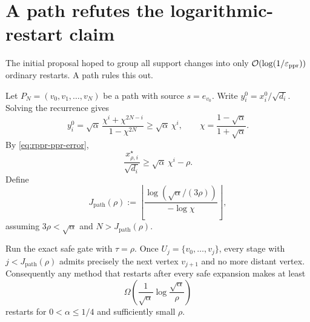 \section{A path refutes the logarithmic-restart claim}
\label{sec:path}

The initial proposal hoped to group all support changes into only
$\mathcal{O}(\log(1/\varepsilon_{\mathrm{ppr}}))$ ordinary restarts.  A path rules this out.

Let $P_N=(v_0,v_1,\ldots,v_N)$ be a path with source $s=e_{v_0}$.  Write
$y_i^0=x_i^0/\sqrt{d_i}$.  Solving the recurrence gives
\begin{equation}
 y_i^0
 =\sqrt\alpha\,
   \frac{\chi^i+\chi^{2N-i}}{1-\chi^{2N}}
 \geq\sqrt\alpha\,\chi^i,
 \qquad
 \chi=\frac{1-\sqrt\alpha}{1+\sqrt\alpha}.
 \label{eq:path-solution}
\end{equation}
By \cref{eq:rppr-ppr-error},
\begin{equation}
  \frac{x_{\rho,i}^\star}{\sqrt{d_i}}
  \geq\sqrt\alpha\,\chi^i-\rho.
  \label{eq:path-rppr-lower}
\end{equation}
Define
\begin{equation}
 J_{\mathrm{path}}(\rho):=\left\lfloor
   \frac{\log(\sqrt\alpha/(3\rho))}{-\log\chi}
 \right\rfloor,
 \label{eq:path-radius}
\end{equation}
assuming $3\rho<\sqrt\alpha$ and $N>J_{\mathrm{path}}(\rho)$.

\begin{theorem}
\label{thm:path-expansion}
Run the exact safe gate with $\tau=\rho$.  Once
$U_j=\{v_0,\ldots,v_j\}$, every stage with
$j<J_{\mathrm{path}}(\rho)$ admits precisely the
next vertex $v_{j+1}$ and no more distant vertex.  Consequently any method
that restarts after every safe expansion makes at least
\begin{equation}
 \Omega\!\left(
   \frac1{\sqrt\alpha}
   \log\frac{\sqrt\alpha}{\rho}
 \right)
 \label{eq:path-restarts}
\end{equation}
restarts for $0<\alpha\leq1/4$ and sufficiently small $\rho$.
\end{theorem}


